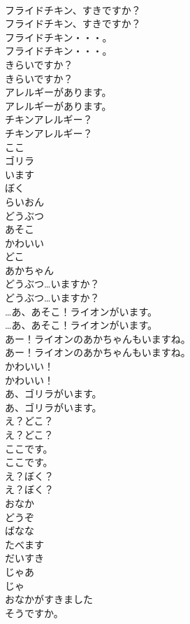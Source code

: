\documentclass[8pt]{extreport}
\begin{document}
\begin{CJK}{UTF8}{min}
\\	フライドチキン、すきですか？	
\\	フライドチキン、すきですか？ 
\\	フライドチキン・・・。	
\\	フライドチキン・・・。 
\\	きらいですか？	
\\	きらいですか？ 
\\	アレルギーがあります。	
\\	アレルギーがあります。 
\\	チキンアレルギー？	
\\	チキンアレルギー？ 
\\	ここ
\\	ゴリラ
\\	います
\\	ぼく
\\	らいおん
\\	どうぶつ
\\	あそこ
\\	かわいい
\\	どこ
\\	あかちゃん
\\	どうぶつ…いますか？	
\\	どうぶつ…いますか？ 
\\	…あ、あそこ！ライオンがいます。	
\\	…あ、あそこ！ライオンがいます。 
\\	あー！ライオンのあかちゃんもいますね。	
\\	あー！ライオンのあかちゃんもいますね。 
\\	かわいい！	
\\	かわいい！ 
\\	あ、ゴリラがいます。	
\\	あ、ゴリラがいます。 
\\	え？どこ？	
\\	え？どこ？ 
\\	ここです。	
\\	ここです。 
\\	え？ぼく？ 
\\	え？ぼく？ 
\\	おなか
\\	どうぞ
\\	ばなな
\\	たべます
\\	だいすき
\\	じゃあ 
\\	じゃ
\\	おなかがすきました
\\	そうですか。

\end{CJK}
\end{document}
